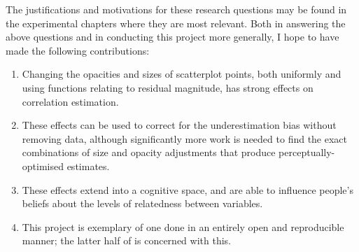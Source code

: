 \documentclass[../main.tex]{subfiles}
\begin{document}
The justifications and motivations for these research questions may be
found in the experimental chapters where they are most relevant. Both in
answering the above questions and in conducting this project more
generally, I hope to have made the following contributions:

\begin{enumerate}
\def\labelenumi{\arabic{enumi}.}
\tightlist
\item
  Changing the opacities and sizes of scatterplot points, both uniformly
  and using functions relating to residual magnitude, has strong effects
  on correlation estimation.
\item
  These effects can be used to correct for the underestimation bias
  without removing data, although significantly more work is needed to
  find the exact combinations of size and opacity adjustments that
  produce perceptually-optimised estimates.
\item
  These effects extend into a cognitive space, and are able to influence
  people's beliefs about the levels of relatedness between variables.
\item
  This project is exemplary of one done in an entirely open and
  reproducible manner; the latter half of  is
  concerned with this.
\end{enumerate}
\end{document}
